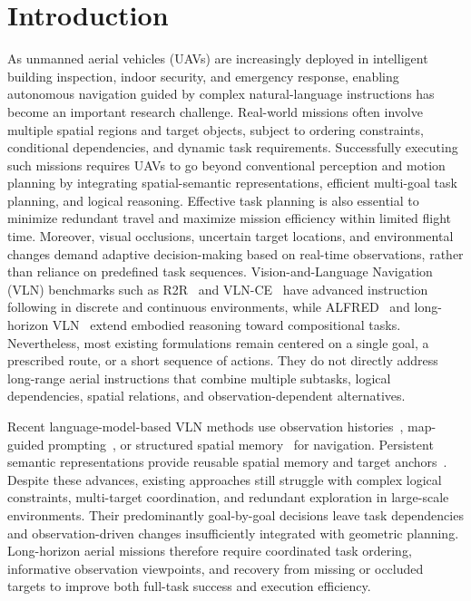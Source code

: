 \documentclass[letterpaper,10pt,journal]{IEEEtran}
\begin{document}
\section{Introduction}
As unmanned aerial vehicles (UAVs) are increasingly deployed in intelligent building inspection, indoor security, and emergency response, enabling autonomous navigation guided by complex natural-language instructions has become an important research challenge. Real-world missions often involve multiple spatial regions and target objects, subject to ordering constraints, conditional dependencies, and dynamic task requirements. Successfully executing such missions requires UAVs to go beyond conventional perception and motion planning by integrating spatial-semantic representations, efficient multi-goal task planning, and logical reasoning. Effective task planning is also essential to minimize redundant travel and maximize mission efficiency within limited flight time. Moreover, visual occlusions, uncertain target locations, and environmental changes demand adaptive decision-making based on real-time observations, rather than reliance on predefined task sequences. Vision-and-Language Navigation (VLN) benchmarks such as R2R~\cite{anderson2018r2r} and VLN-CE~\cite{krantz2020vlnce} have advanced instruction following in discrete and continuous environments, while ALFRED~\cite{shridhar2020alfred} and long-horizon VLN~\cite{song2024lhvln} extend embodied reasoning toward compositional tasks. Nevertheless, most existing formulations remain centered on a single goal, a prescribed route, or a short sequence of actions. They do not directly address long-range aerial instructions that combine multiple subtasks, logical dependencies, spatial relations, and observation-dependent alternatives.

Recent language-model-based VLN methods use observation histories~\cite{zhou2024navgpt}, map-guided prompting~\cite{chen2024mapgpt}, or structured spatial memory~\cite{jiang2025spatialgpt} for navigation. Persistent semantic representations provide reusable spatial memory and target anchors~\cite{huang2023vlmaps,gu2024conceptgraphs,werby2024hovsg}. Despite these advances, existing approaches still struggle with complex logical constraints, multi-target coordination, and redundant exploration in large-scale environments. Their predominantly goal-by-goal decisions leave task dependencies and observation-driven changes insufficiently integrated with geometric planning. Long-horizon aerial missions therefore require coordinated task ordering, informative observation viewpoints, and recovery from missing or occluded targets to improve both full-task success and execution efficiency.
\end{document}

